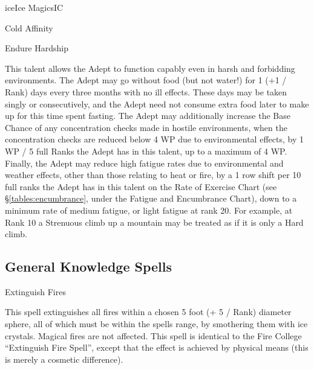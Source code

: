 \begin{college}[1.5]{ice}{Ice Magics}{IC}
\begin{talent}[T-1]{Cold Affinity}
\begin{effects}
\end{effects}
\end{talent}

\begin{talent}[T-2]{Endure Hardship}

\begin{effects}
This talent allows the Adept to function capably even in harsh and
forbidding environments.  The Adept may go without food (but not
water!) for 1 (+1 / Rank) days every three months with no ill effects.
These days may be taken singly or consecutively, and the Adept need
not consume extra food later to make up for this time spent fasting.
The Adept may additionally increase the Base Chance of any
concentration checks made in hostile environments, when the
concentration checks are reduced below 4 \x WP due to environmental
effects, by 1 \x WP / 5 full Ranks the Adept has in this talent, up to
a maximum of 4 \x WP.  Finally, the Adept may reduce high fatigue
rates due to environmental and weather effects, other than those
relating to heat or fire, by a 1 row shift per 10 full ranks the Adept
has in this talent on the Rate of Exercise Chart (see
\S\ref{tables:encumbrance}, under the Fatigue and Encumbrance Chart),
down to a minimum rate of medium fatigue, or light fatigue at rank 20.
For example, at Rank 10 a Strenuous climb up a mountain may be treated
as if it is only a Hard climb.
\end{effects}
\end{talent}

\subsection{General Knowledge Spells}

\begin{spell}[G-1]{Extinguish Fires}

\begin{effects}
This spell extinguishes all fires within a chosen 5 foot (+ 5 / Rank)
diameter sphere, all of which must be within the spells range, by
smothering them with ice crystals.  Magical fires are not
affected. This spell is identical to the Fire College ``Extinguish Fire
Spell'', except that the effect is achieved by physical means (this is
merely a cosmetic difference).
\end{effects}
\end{spell}


\end{college}
